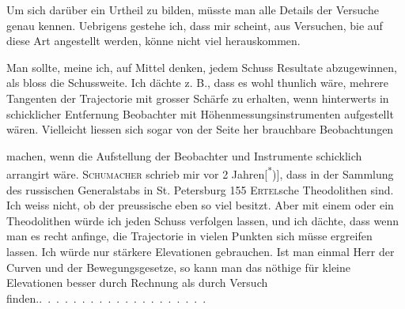 Um sich darüber ein Urtheil zu bilden, müsste man alle Details der Versuche
genau kennen. Uebrigens gestehe ich, dass mir scheint, aus Versuchen,
bie  auf diese Art angestellt werden, könne nicht viel herauskommen.
\par\noindent\begin{minipage}[t]{.42\textwidth}\vspace{0pt}\centering
{}
\end{minipage}\hfill
\begin{minipage}[t]{.55\textwidth}\vspace{0pt}\setlength{\parindent}{1.2em}
\noindent Man sollte, meine ich, auf Mittel denken,
jedem Schuss  Resultate abzugewinnen,
als bloss die Schussweite. Ich
dächte z. B., dass es wohl thunlich wäre,
mehrere Tangenten der Trajectorie mit
grosser Schärfe zu erhalten, wenn hinterwerts
in schicklicher Entfernung Beobachter
mit Höhenmessungsinstrumenten aufgestellt
wären. Vielleicht liessen sich sogar von
der Seite her brauchbare Beobachtungen
\end{minipage}
\clearpage{}
\noindent machen, wenn die Aufstellung der Beobachter und Instrumente schicklich
arrangirt wäre. \textsc{Schumacher} schrieb mir vor 2 Jahren[\textsuperscript{*})]\begingroup\renewcommand{\thefootnote}{}\endgroup, dass in der Sammlung
des russischen Generalstabs in St. Petersburg 155 \textsc{Ertel}sche Theodolithen
sind. Ich weiss nicht, ob der preussische eben so viel besitzt. Aber
mit einem oder ein  Theodolithen würde ich jeden Schuss
verfolgen lassen, und ich dächte, dass wenn man es recht anfinge, die Trajectorie
in vielen Punkten sich müsse ergreifen lassen. Ich würde nur
stärkere Elevationen gebrauchen. Ist man einmal Herr der Curven und
der Bewegungsgesetze, so kann man das nöthige für kleine Elevationen besser
durch Rechnung als durch Versuch finden.\quad .\ .\ .\ .\ .\ .\ .\ .\ .\ .\ .\ .\ .\ .\ .\ .\ .\ .\ .\ .
\clearpage\endgroup
